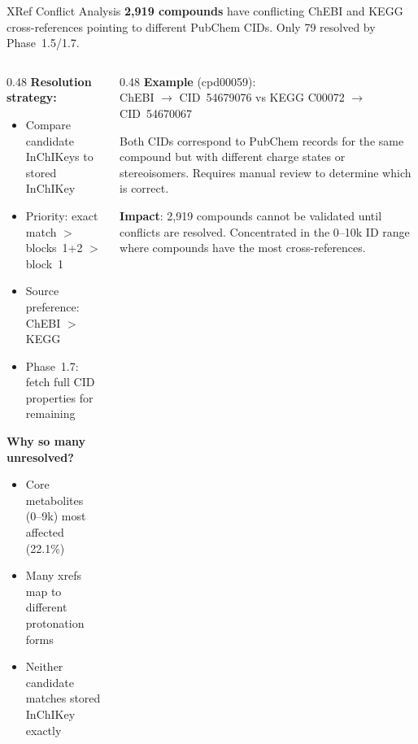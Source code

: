 \documentclass[aspectratio=169,11pt]{beamer}
\begin{document}
\begin{frame}{XRef Conflict Analysis}
\small
\textbf{2,919 compounds} have conflicting ChEBI and KEGG cross-references
pointing to different PubChem CIDs. Only 79 resolved by Phase~1.5/1.7.

\vspace{-2pt}
\begin{columns}[T]
\begin{column}{0.48\textwidth}
\textbf{Resolution strategy:}\footnotesize
\begin{itemize}\setlength\itemsep{0pt}
  \item Compare candidate InChIKeys to stored InChIKey
  \item Priority: exact match $>$ blocks~1+2 $>$ block~1
  \item Source preference: ChEBI $>$ KEGG
  \item Phase~1.7: fetch full CID properties for remaining
\end{itemize}

\textbf{Why so many unresolved?}\footnotesize
\begin{itemize}\setlength\itemsep{0pt}
  \item Core metabolites (0--9k) most affected (22.1\%)
  \item Many xrefs map to different protonation forms
  \item Neither candidate matches stored InChIKey exactly
\end{itemize}
\end{column}

\begin{column}{0.48\textwidth}
\textbf{Example} (cpd00059):\footnotesize\\[2pt]
ChEBI $\to$ CID~54679076 \quad vs \quad KEGG C00072 $\to$ CID~54670067

\smallskip
\footnotesize
Both CIDs correspond to PubChem records for the same compound
but with different charge states or stereoisomers.
Requires manual review to determine which is correct.

\smallskip
\textbf{Impact}: 2,919 compounds cannot be validated
until conflicts are resolved. Concentrated in the 0--10k
ID range where compounds have the most cross-references.
\end{column}
\end{columns}

\end{frame}
\end{document}
